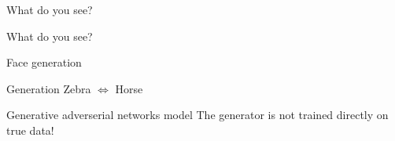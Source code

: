 \begin{frame}{What do you see?}
\end{frame}

\begin{frame}{What do you see?}
\end{frame}

\begin{frame}{Face generation}
\end{frame}

\begin{frame}{Generation Zebra $\iff$ Horse}
\end{frame}

\begin{frame}{Generative adverserial networks model}
  The generator is not trained directly on true data!
\end{frame}
